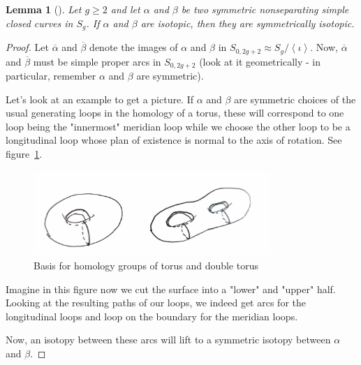 \documentclass[reqno]{amsart}
\newtheorem{lemma}[theorem]{Lemma}
\theoremstyle{definition}
\theoremstyle{remark}
\begin{document}
   \begin{lemma}[]\label{loops-isotopic-iff-symmetrically-isotopic}
       Let $g \ge 2$ and let $\alpha$ and $\beta$ be
       two symmetric nonseparating simple closed
       curves in $S_g$. If $\alpha$ and $\beta$ are isotopic,
       then they are symmetrically isotopic.
   \end{lemma}

   \begin{proof}
       Let $\overline{\alpha}$ and $\overline{\beta}$ 
       denote the images of $\alpha$ and $\beta$ 
       in $S_{0,2g+2}\approx S_g / \left<\iota \right>$.
       Now,
       $ \overline{\alpha}$ and $ \overline{\beta}$
       must be simple proper arcs in $S_{0,2g+2}$ (look
       at it geometrically - in particular, remember $\alpha$ and
       $\beta$ are symmetric).

       Let's look at an example to get a picture. If
       $\alpha$ and $\beta$ are symmetric choices of the
       usual generating loops in the homology of a torus, these
       will correspond to one loop being the
       "innermost" meridian loop while we choose the
       other loop to be a longitudinal loop
       whose plan of existence is
       normal to the axis of rotation. See
       figure~\ref{fig:homology-basis-of-torus-and-double-torus-png}.

       \begin{figure}[htpb]
           \centering
           \includegraphics[width=0.8\textwidth]{homology-basis-of-torus-and-double-torus.jpg}
           \caption{Basis for homology groups of torus and
           double torus}
           \label{fig:homology-basis-of-torus-and-double-torus-png}
       \end{figure}
       Imagine in this figure now we cut the surface into a "lower"
       and "upper" half. Looking at the resulting paths of
       our loops, we indeed get arcs for the longitudinal loops
       and loop on the boundary for the meridian loops.




       
       Now, an isotopy between
       these arcs will lift to a symmetric isotopy
       between $\alpha$ and $\beta$.



\end{proof}
\end{document}
